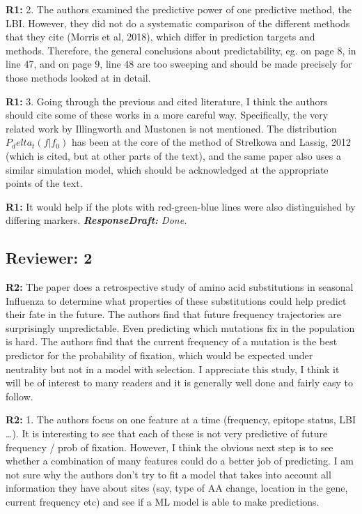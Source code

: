 \documentclass[aps,rmp,onecolumn]{revtex4-1}
\newcommand{\refa}[1]{\textbf{R1:} #1\vskip 5mm}
\newcommand{\refb}[1]{\textbf{R2:} #1\vskip 5mm}
\newcommand{\responsedraft}[1]{{\it {\color{purple}\textbf{ResponseDraft:} #1}}}
\begin{document}
\refa{2. The authors examined the predictive power of one predictive
method, the LBI. However, they did not do a systematic comparison of
the different methods that they cite (Morris et al, 2018), which differ in prediction
targets and methods. Therefore, the general conclusions about
predictability, eg. on page 8, in line 47, and on page 9, line 48 are
too sweeping and should be made precisely for those methods looked at
in detail.}

\refa{3. Going through the previous and cited literature, I think the authors should cite some of these works in a more careful way. Specifically, the very related work by Illingworth and Mustonen is not mentioned. The distribution $P_delta_t(f|f_0)$ has been at the core of
the method of Strelkowa and Lassig, 2012 (which is cited, but at other
parts of the text), and the same paper also uses a similar simulation model, which should be acknowledged at the appropriate points of the text.}

\refa{It would help if the plots with red-green-blue lines were also distinguished by differing markers.}
\responsedraft{Done.}


\subsection*{Reviewer: 2}

\refb{The paper does a retrospective study of amino acid substitutions in seasonal Influenza to determine what properties of these substitutions could help predict their fate in the future. The authors find that future frequency trajectories are surprisingly unpredictable. Even predicting which mutations fix in the population is hard. The authors find that the current frequency of a mutation is the best predictor for the probability of fixation, which would be expected under neutrality but not in a model with selection. 
I appreciate this study, I think it will be of interest to many readers and it is generally well done and fairly easy to follow. 
}

\refb{1. The authors focus on one feature at a time (frequency, epitope status, LBI …). It is interesting to see that each of these is not very predictive of future frequency / prob of fixation. However, I think the obvious next step is to see whether a combination of many features could do a better job of predicting. I am not sure why the authors don’t try to fit a model that takes into account all information they have about sites (say, type of AA change, location in the gene, current frequency etc) and see if a ML model is able to make predictions. }
\end{document}
